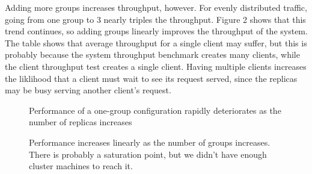 \documentclass[letterpaper,10pt]{article}
\begin{document}
Adding more groups increases throughput, however. For evenly
distributed traffic, going from one group to 3 nearly triples the
throughput. Figure 2 shows that this trend continues, so adding groups
linearly improves the throughput of the system. The table shows that
average throughput for a single client may suffer, but this is
probably because the system throughput benchmark creates many clients,
while the client throughput test creates a single client. Having
multiple clients increases the liklihood that a client must wait to
see its request served, since the replicas may be busy serving another
client's request.

\begin{figure}[H]
\centering
{}
\caption{Performance of a one-group configuration rapidly deteriorates as the number of replicas increases}
\label{fig:replicas}
\end{figure}

\begin{figure}[H]
\centering
{}
\caption{Performance increases linearly as the number of groups increases. There is probably a saturation point, but we didn't have enough cluster machines to reach it.}
\label{fig:groups}
\end{figure}
\end{document}
